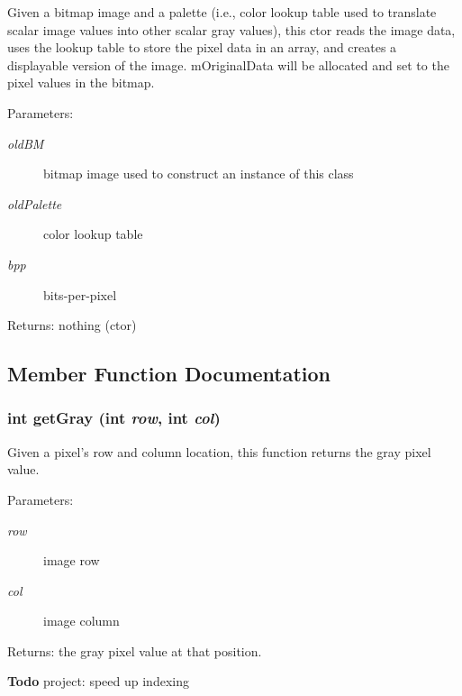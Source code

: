 Given a bitmap image and a palette (i.e., color lookup table used to translate scalar image values into other scalar gray values), this ctor reads the image data, uses the lookup table to store the pixel data in an array, and creates a displayable version of the image. m\-Original\-Data will be allocated and set to the pixel values in the bitmap. 

\begin{Desc}
\item[Parameters:]
\begin{description}
\item[{\em old\-BM}]bitmap image used to construct an instance of this class \item[{\em old\-Palette}]color lookup table \item[{\em bpp}]bits-per-pixel \end{description}
\end{Desc}
\begin{Desc}
\item[Returns:]nothing (ctor) \end{Desc}


\subsection{Member Function Documentation}
\subsubsection{\setlength{\rightskip}{0pt plus 5cm}int get\-Gray (int {\em row}, int {\em col})}\label{class_c_s_image_viewer_1_1_gray_image_data_dcb7178c700e5ead72cd80cf91d05c2e}


Given a pixel's row and column location, this function returns the gray pixel value. 

\begin{Desc}
\item[Parameters:]
\begin{description}
\item[{\em row}]image row \item[{\em col}]image column \end{description}
\end{Desc}
\begin{Desc}
\item[Returns:]the gray pixel value at that position.\end{Desc}
\begin{Desc}
\item[{\bf Todo}]project: speed up indexing \end{Desc}
